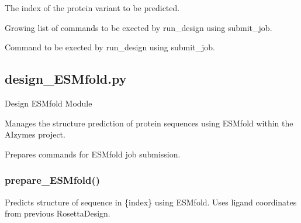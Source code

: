 \documentclass[10pt]{extarticle}
\begin{document}
\par\vspace*{0.5\baselineskip}
{
\begin{description}[noitemsep,topsep=0pt,parsep=0pt,labelwidth=5cm,leftmargin=!,labelindent=0pt,labelsep=0.2cm,itemsep=0pt]
\item[\textcolor{mpgAccentBlue!75!white}{index (str)\dotfill}] The index of the protein variant to be predicted.
\item[\textcolor{mpgAccentBlue!75!white}{cmd (str)\dotfill}] Growing list of commands to be exected by run\_design using submit\_job.
\end{description}
}
\par\vspace*{0.5\baselineskip}
{
\begin{description}[noitemsep,topsep=0pt,parsep=0pt,labelwidth=5cm,leftmargin=!,labelindent=0pt,labelsep=0.2cm,itemsep=0pt]
\item[\textcolor{mpgAccentBlue!75!white}{cmd (str)\dotfill}] Command to be exected by run\_design using submit\_job.
\end{description}
}
\subsection{design\_ESMfold.py}
Design ESMfold Module

Manages the structure prediction of protein sequences using ESMfold within the AIzymes project.

\par\vspace*{0.5\baselineskip}
{
\begin{description}[noitemsep,topsep=0pt,parsep=0pt,labelwidth=5cm,leftmargin=!,labelindent=0pt,labelsep=0.2cm,itemsep=0pt]
\item[\textcolor{mpgAccentBlue!75!white}{- prepare\_ESMfold\dotfill}] Prepares commands for ESMfold job submission.
\end{description}
}
\subsubsection{prepare\_ESMfold()}
Predicts structure of sequence in \{index\} using ESMfold. Uses ligand coordinates from previous RosettaDesign.
\end{document}
